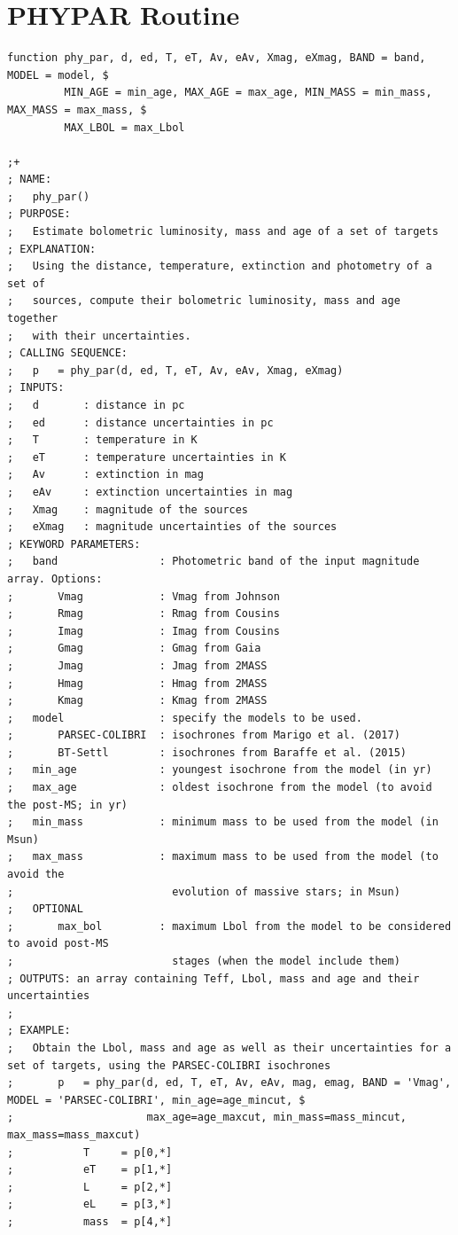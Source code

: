 \documentclass[12pt]{article}
\begin{document}
\section{PHYPAR Routine}
\label{sec_app:phypar}
{\scriptsize
\begin{Verbatim}[tabsize=4]
function phy_par, d, ed, T, eT, Av, eAv, Xmag, eXmag, BAND = band, MODEL = model, $
		 MIN_AGE = min_age, MAX_AGE = max_age, MIN_MASS = min_mass, MAX_MASS = max_mass, $
		 MAX_LBOL = max_Lbol

;+
; NAME:
;	phy_par()
; PURPOSE:
;	Estimate bolometric luminosity, mass and age of a set of targets
; EXPLANATION:
;	Using the distance, temperature, extinction and photometry of a set of 
;	sources, compute their bolometric luminosity, mass and age together 
;	with their uncertainties.
; CALLING SEQUENCE:
;	p	= phy_par(d, ed, T, eT, Av, eAv, Xmag, eXmag)
; INPUTS:
;	d		: distance in pc
;	ed		: distance uncertainties in pc
;	T		: temperature in K
;	eT		: temperature uncertainties in K
;	Av		: extinction in mag
;	eAv		: extinction uncertainties in mag
;	Xmag	: magnitude of the sources
;	eXmag	: magnitude uncertainties of the sources
; KEYWORD PARAMETERS:
;	band				: Photometric band of the input magnitude array. Options:
;		Vmag			: Vmag from Johnson
;		Rmag			: Rmag from Cousins
;		Imag			: Imag from Cousins
;		Gmag			: Gmag from Gaia
;		Jmag			: Jmag from 2MASS
;		Hmag			: Hmag from 2MASS
;		Kmag			: Kmag from 2MASS
;	model				: specify the models to be used. 
;		PARSEC-COLIBRI	: isochrones from Marigo et al. (2017)
;		BT-Settl 		: isochrones from Baraffe et al. (2015)
;	min_age				: youngest isochrone from the model (in yr)
;	max_age				: oldest isochrone from the model (to avoid the post-MS; in yr)
;	min_mass			: minimum mass to be used from the model (in Msun)
;	max_mass			: maximum mass to be used from the model (to avoid the 
;						  evolution of massive stars; in Msun)
;	OPTIONAL
;		max_bol			: maximum Lbol from the model to be considered to avoid post-MS 
;						  stages (when the model include them)
; OUTPUTS: an array containing Teff, Lbol, mass and age and their uncertainties
;
; EXAMPLE:
;	Obtain the Lbol, mass and age as well as their uncertainties for a set of targets, using the PARSEC-COLIBRI isochrones
;		p   = phy_par(d, ed, T, eT, Av, eAv, mag, emag, BAND = 'Vmag', MODEL = 'PARSEC-COLIBRI', min_age=age_mincut, $
;			          max_age=age_maxcut, min_mass=mass_mincut, max_mass=mass_maxcut)
;			T     = p[0,*]
;			eT    = p[1,*]
;			L     = p[2,*]
;			eL    = p[3,*]
;			mass  = p[4,*]

\end{Verbatim}}
\end{document}

